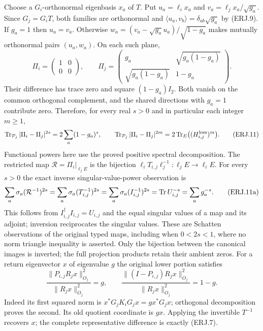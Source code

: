 Choose a $G_i$-orthonormal eigenbasis $x_a$ of $T$. Put
$u_a=\ell_ix_a$ and $v_a=\ell_jx_a/\sqrt{g_a}$.
Since $G_j=G_iT$, both families are orthonormal and
$\langle u_a,v_b\rangle=\delta_{ab}\sqrt{g_a}$ by (ERJ.9).
If $g_a=1$ then $u_a=v_a$. Otherwise
$w_a=(v_a-\sqrt{g_a}u_a)/\sqrt{1-g_a}$ makes mutually
orthonormal pairs $(u_a,w_a)$. On each such plane,
\[
 \Pi_i=\begin{pmatrix}1&0\\0&0\end{pmatrix},\qquad
 \Pi_j=\begin{pmatrix}g_a&\sqrt{g_a(1-g_a)}\\
                    \sqrt{g_a(1-g_a)}&1-g_a\end{pmatrix}.
 \tag{ERJ.10}
\]
Their difference has trace zero and square $(1-g_a)I_2$.
Both vanish on the common orthogonal complement, and the shared
directions with $g_a=1$ contribute zero. Therefore, for every real
$s>0$ and in particular each integer $m\ge1$,
\[
 \operatorname{Tr}_{\mathcal P_j}|\Pi_i-\Pi_j|^{2s}
       =2\sum_a(1-g_a)^s,
 \qquad
 \operatorname{Tr}_{\mathcal P_j}|\Pi_i-\Pi_j|^{2m}
       =2\operatorname{Tr}_E\bigl((H_{i,j}^{\rm loss})^m\bigr).\tag{ERJ.11}
\]
Functional powers here use the proved positive spectral decomposition.
The restricted map $\mathcal R=\Pi_i|_{\ell_jE}$ is the bijection
$\ell_iT_{i,j}\ell_j^{-1}:\ell_jE\to\ell_iE$.
For every $s>0$ the exact inverse singular-value-power observation is
\[
 \sum_a\sigma_a(\mathcal R^{-1})^{2s}
 =\sum_a\sigma_a(T_{i,j}^{-1})^{2s}
 =\sum_a\sigma_a(I_{i,j}^{-1})^{2s}
 =\operatorname{Tr} U_{i,j}^{-s}=\sum_a g_a^{-s}.\tag{ERJ.11a}
\]
This follows from $I_{i,j}^{\dagger}I_{i,j}=U_{i,j}$ and the
equal singular values of a map and its adjoint; inversion reciprocates
the singular values. These are Schatten observations of the original
typed maps, including when $0<2s<1$, where no norm triangle inequality
is asserted. Only the bijection between the canonical images is
inverted; the full projection products retain their ambient zeros.
For a return eigenvector $x$ of eigenvalue $g$ the original lower
portion satisfies
\[
 \frac{\|P_{i,j}R_jx\|_{O_j}^2}{\|R_jx\|_{O_j}^2}=g,
 \qquad
 \frac{\|(I-P_{i,j})R_jx\|_{O_j}^2}{\|R_jx\|_{O_j}^2}=1-g.
 \tag{ERJ.12}
\]
Indeed its first squared norm is $x^*G_jK_iG_jx=gx^*G_jx$;
orthogonal decomposition proves the second. Its old quotient coordinate
is $gx$. Applying the invertible $T^{-1}$ recovers $x$; the complete
representative difference is exactly (ERJ.7).


